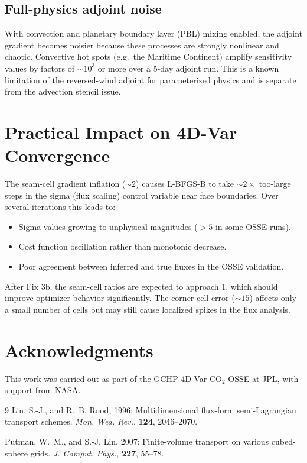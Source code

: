 \documentclass[11pt]{article}
\begin{document}
\subsection{Full-physics adjoint noise}

With convection and planetary boundary layer (PBL) mixing enabled, the
adjoint gradient becomes noisier because these processes are strongly
nonlinear and chaotic. Convective hot spots (e.g.\ the Maritime Continent)
amplify sensitivity values by factors of $\sim 10^3$ or more over a 5-day
adjoint run. This is a known limitation of the reversed-wind adjoint for
parameterized physics and is separate from the advection stencil issue.

\section{Practical Impact on 4D-Var Convergence}

The seam-cell gradient inflation ($\sim 2$) causes L-BFGS-B to take
$\sim 2\times$ too-large steps in the sigma (flux scaling) control variable
near face boundaries. Over several iterations this leads to:
\begin{itemize}
  \item Sigma values growing to unphysical magnitudes ($> 5$ in some OSSE runs).
  \item Cost function oscillation rather than monotonic decrease.
  \item Poor agreement between inferred and true fluxes in the OSSE validation.
\end{itemize}
After Fix 3b, the seam-cell ratios are expected to approach 1, which should
improve optimizer behavior significantly. The corner-cell error ($\sim 15$)
affects only a small number of cells but may still cause localized spikes in
the flux analysis.

\section*{Acknowledgments}

This work was carried out as part of the GCHP 4D-Var CO$_2$ OSSE at JPL,
with support from NASA.

\begin{thebibliography}{9}
  Lin, S.-J., and R.~B. Rood, 1996: Multidimensional flux-form
  semi-Lagrangian transport schemes. \textit{Mon. Wea. Rev.}, \textbf{124},
  2046--2070.

  Putman, W.~M., and S.-J. Lin, 2007: Finite-volume transport on various
  cubed-sphere grids. \textit{J. Comput. Phys.}, \textbf{227}, 55--78.
\end{thebibliography}
\end{document}
